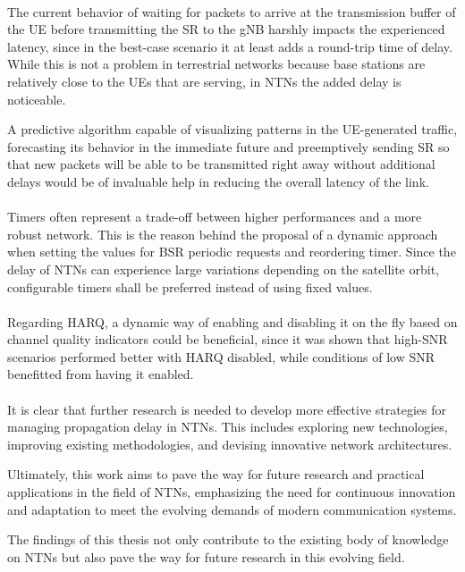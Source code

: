 \paragraph{}
The current behavior of waiting for packets to arrive at the transmission buffer of the \ac{UE} before transmitting the \ac{SR} to the \ac{gNB} harshly impacts the experienced latency, since in the best-case scenario it at least adds a round-trip time of delay. While this is not a problem in terrestrial networks because base stations are relatively close to the \ac{UE}s that are serving, in \ac{NTN}s the added delay is noticeable. 

A predictive algorithm capable of visualizing patterns in the \ac{UE}-generated traffic, forecasting its behavior in the immediate future and preemptively sending \ac{SR} so that new packets will be able to be transmitted right away without additional delays would be of invaluable help in reducing the overall latency of the link.

\paragraph{}
Timers often represent a trade-off between higher performances and a more robust network. This is the reason behind the proposal of a dynamic approach when setting the values for \ac{BSR} periodic requests and reordering timer. Since the delay of \ac{NTN}s can experience large variations depending on the satellite orbit, configurable timers shall be preferred instead of using fixed values.

\paragraph{}
Regarding \ac{HARQ}, a dynamic way of enabling and disabling it on the fly based on channel quality indicators could be beneficial, since it was shown that high-\ac{SNR} scenarios performed better with \ac{HARQ} disabled, while conditions of low \ac{SNR} benefitted from having it enabled.

\paragraph{}

It is clear that further research is needed to develop more effective strategies for managing propagation delay in \ac{NTN}s. This includes exploring new technologies, improving existing methodologies, and devising innovative network architectures.

Ultimately, this work aims to pave the way for future research and practical applications in the field of \ac{NTN}s, emphasizing the need for continuous innovation and adaptation to meet the evolving demands of modern communication systems. 

The findings of this thesis not only contribute to the existing body of knowledge on \ac{NTN}s but also pave the way for future research in this evolving field.
